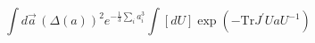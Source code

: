 \begin{equation}
\int d\vec{a}\, (\Delta(a))^2 e^{-\frac{1}{3}\sum_i a_i^3}\int[dU] \exp(-%
\mbox{Tr}J^{\prime}UaU^{-1})
\end{equation}

